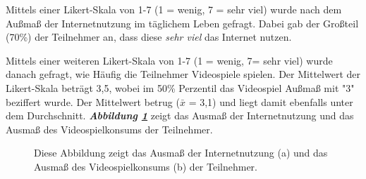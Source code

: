\documentclass[a4paper,11pt]{article}%
\renewcommand{\\}{\vspace*{0.5\baselineskip} \newline}
\begin{document}
Mittels einer Likert-Skala von 1-7 (1 = wenig, 7 = sehr viel) wurde nach dem Außmaß der Internetnutzung im täglichem Leben gefragt. Dabei gab der Großteil (70\%) der Teilnehmer an, dass diese \textit{sehr viel} das Internet nutzen.

Mittels einer weiteren Likert-Skala von 1-7 (1 = wenig, 7= sehr viel) wurde danach gefragt, wie Häufig die Teilnehmer Videospiele spielen. Der Mittelwert der Likert-Skala beträgt 3,5, wobei im 50\% Perzentil das Videospiel Außmaß mit "3" beziffert wurde. Der Mittelwert betrug ($\bar{x}$ = 3,1) und liegt damit ebenfalls unter dem Durchschnitt.
\textbf{\textit{Abbildung \ref{teilnehmerInternetVideospiele}}} zeigt das Ausmaß der Internetnutzung und das Ausmaß des Videospielkonsums der Teilnehmer.
\begin{figure}[h]
  \centering
  \qquad
  \caption[Das Ausmaß der Internetnutzung und des Videospielkonsums der Teilnehmer]{Diese Abbildung zeigt das Ausmaß der Internetnutzung (a) und das Ausmaß des Videospielkonsums (b) der Teilnehmer.}
  \label{teilnehmerInternetVideospiele}
\end{figure}

	
\end{document}
